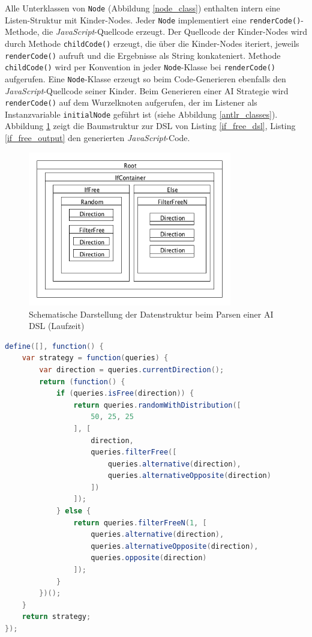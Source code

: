 \documentclass[conference]{IEEEtran}
\begin{document}
Alle Unterklassen von \texttt{Node} (Abbildung  \ref{node_class}) enthalten intern eine Listen-Struktur mit Kinder-Nodes. Jeder  \texttt{Node} implementiert eine \texttt{renderCode()}-Methode, die \emph{JavaScript}-Quellcode erzeugt. Der Quellcode der Kinder-Nodes wird durch Methode \texttt{childCode()} erzeugt, die über die Kinder-Nodes iteriert, jeweils \texttt{renderCode()} aufruft und die Ergebnisse als String konkateniert. Methode \texttt{childCode()} wird per Konvention in jeder  \texttt{Node}-Klasse bei \texttt{renderCode()} aufgerufen. Eine  \texttt{Node}-Klasse erzeugt so beim Code-Generieren ebenfalls den \emph{JavaScript}-Quellcode seiner Kinder. Beim Generieren einer AI Strategie wird \texttt{renderCode()} auf dem Wurzelknoten aufgerufen, der im Listener als Instanzvariable \texttt{initialNode} geführt ist (siehe Abbildung \ref{antlr_classes}). Abbildung \ref{node_structure_ex} zeigt die Baumstruktur zur DSL von Listing \ref{if_free_dsl}, Listing \ref{if_free_output} den generierten \emph{JavaScript}-Code.


\begin{figure}[!htb]
\centering
\includegraphics[width=3.5in]{node_structure_ex.png}
\caption{Schematische Darstellung der Datenstruktur beim Parsen einer AI DSL (Laufzeit)}
\label{node_structure_ex}
\end{figure}

\begin{lstlisting}[language=Java, captionpos=b, caption=Beispiel zu generiertem JavaScript-Code einer AI DSL, label=if_free_output]
 define([], function() {
    var strategy = function(queries) {
        var direction = queries.currentDirection();
        return (function() {
            if (queries.isFree(direction)) {
                return queries.randomWithDistribution([
                    50, 25, 25
                ], [
                    direction,
                    queries.filterFree([
                        queries.alternative(direction),
                        queries.alternativeOpposite(direction)
                    ])
                ]);
            } else {
                return queries.filterFreeN(1, [
                    queries.alternative(direction),
                    queries.alternativeOpposite(direction),
                    queries.opposite(direction)
                ]);
            }
        })();
    }
    return strategy;
});
\end{lstlisting}
\end{document}
